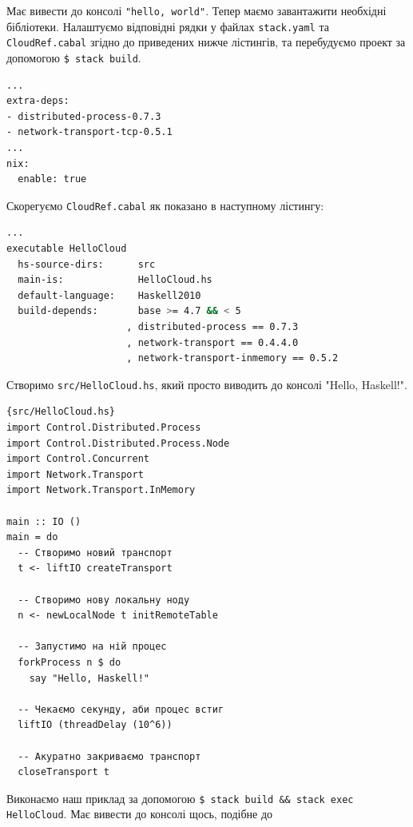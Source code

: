 \documentclass[12pt]{article}
\begin{document}
Має вивести до консолі \lstinline{"hello, world"}. Тепер маємо завантажити необхідні бібліотеки. Налаштуємо 
відповідні рядки у файлах \lstinline{stack.yaml} та \lstinline{CloudRef.cabal} згідно до приведених нижче 
лістингів, та перебудуємо проект за допомогою \lstinline{$ stack build}.\\

\begin{lstlisting}[language=bash, caption={stack.yaml}]
...
extra-deps:
- distributed-process-0.7.3
- network-transport-tcp-0.5.1
...
nix:
  enable: true
\end{lstlisting}

Скорегуємо \lstinline{CloudRef.cabal} як показано в наступному лістингу:\\

\begin{lstlisting}[language=bash, caption={CloudRef.cabal}]
...
executable HelloCloud
  hs-source-dirs:      src
  main-is:             HelloCloud.hs
  default-language:    Haskell2010
  build-depends:       base >= 4.7 && < 5
                     , distributed-process == 0.7.3
                     , network-transport == 0.4.4.0
                     , network-transport-inmemory == 0.5.2
\end{lstlisting}

Створимо \lstinline{src/HelloCloud.hs}, який просто виводить до консолі "Hello, Haskell!".\\

\begin{lstlisting}{src/HelloCloud.hs}
import Control.Distributed.Process
import Control.Distributed.Process.Node 
import Control.Concurrent
import Network.Transport
import Network.Transport.InMemory 

main :: IO ()
main = do
  -- Створимо новий транспорт
  t <- liftIO createTransport

  -- Створимо нову локальну ноду
  n <- newLocalNode t initRemoteTable

  -- Запустимо на ній процес
  forkProcess n $ do
    say "Hello, Haskell!"

  -- Чекаємо секунду, аби процес встиг
  liftIO (threadDelay (10^6))

  -- Акуратно закриваємо транспорт
  closeTransport t

\end{lstlisting}

Виконаємо наш приклад за допомогою \lstinline{$ stack build && stack exec HelloCloud}. 
Має вивести до консолі щось, подібне до\\
\end{document}
